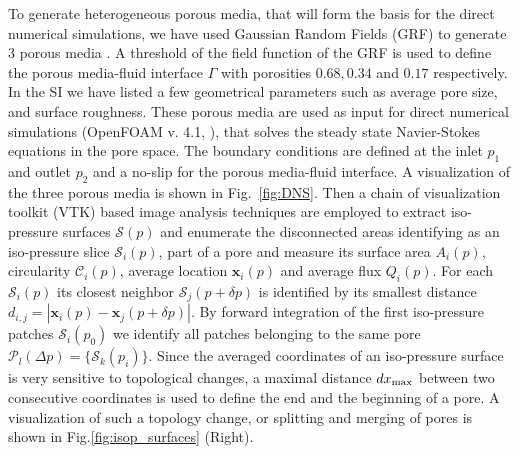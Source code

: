 \documentclass[draft]{agujournal2019}
\begin{document}
To generate heterogeneous porous media, that will form the basis for the direct numerical simulations, we have used Gaussian Random Fields (GRF) to generate 3 porous media \cite{teubner_level_1991,hyman_heterogeneities_2012,siena_relationship_2014}. A threshold of the field function of the GRF is used to define the porous media-fluid interface $\Gamma$ with porosities $0.68, 0.34$ and $0.17$ respectively. In the SI we have listed a few geometrical parameters such as average pore size, and surface roughness. These porous media are used as input for direct numerical simulations (OpenFOAM v. 4.1, ), that solves the steady state Navier-Stokes equations in the pore space. The boundary conditions are defined at the inlet $p_1$ and outlet $p_2$ and a no-slip for the porous media-fluid interface. A visualization of the three porous media is shown in Fig.~\ref{fig:DNS}. Then a chain of visualization toolkit (VTK) based image analysis techniques \cite{schroeder_visualization_2006,hernderson_paraview_2007} are employed to extract iso-pressure surfaces $\mathcal{S}(p)$ and enumerate the disconnected areas identifying as an iso-pressure slice $\mathcal{S}_i(p)$, part of a pore and measure its surface area $A_i(p)$, circularity $\mathcal{C}_i(p)$, average location $\mathbf{x}_i(p)$ and average flux $Q_i(p)$. For each $\mathcal{S}_i(p)$ its closest neighbor $\mathcal{S}_j(p+\delta p)$ is identified by its smallest distance $d_{i,j}= \left|  \mathbf{x}_i(p)-\mathbf{x}_j(p+\delta p)\right|$. By forward integration of the first iso-pressure patches $\mathcal{S}_i(p_0)$ we identify all patches belonging to the same pore $\mathcal{P}_l(\Delta p) = \{\mathcal{S}_k(p_i)\}$. Since the averaged coordinates of an iso-pressure surface is very sensitive to topological changes, a maximal distance $dx_{\rm{max}}$ between two consecutive coordinates is used to define the end and the beginning of a pore. A visualization of such a topology change, or splitting and merging of pores is shown in Fig.\ref{fig:isop_surfaces} (Right).
\end{document}
